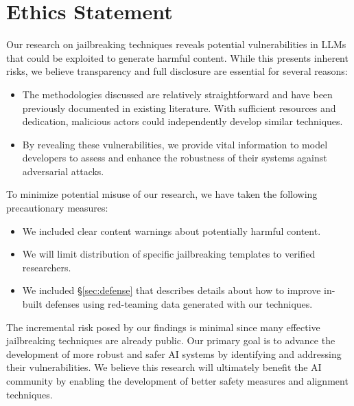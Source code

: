 \section*{Ethics Statement}





Our research on jailbreaking techniques reveals potential vulnerabilities in LLMs that could be exploited to generate harmful content. While this presents inherent risks, we believe transparency and full disclosure are essential for several reasons:

\begin{itemize}
    \item The methodologies discussed are relatively straightforward and have been previously documented in existing literature. With sufficient resources and dedication, malicious actors could independently develop similar techniques.
    \item By revealing these vulnerabilities, we provide vital information to model developers to assess and enhance the robustness of their systems against adversarial attacks.
\end{itemize}

To minimize potential misuse of our research, we have taken the following precautionary measures:
\begin{itemize}
    \item We included clear content warnings about potentially harmful content.
    \item We will limit distribution of specific jailbreaking templates to verified researchers.
    \item We included \S\ref{sec:defense} that describes details about how to improve in-built defenses using red-teaming data generated with our techniques.
\end{itemize}

The incremental risk posed by our findings is minimal since many effective jailbreaking techniques are already public. Our primary goal is to advance the development of more robust and safer AI systems by identifying and addressing their vulnerabilities. We believe this research will ultimately benefit the AI community by enabling the development of better safety measures and alignment techniques.
